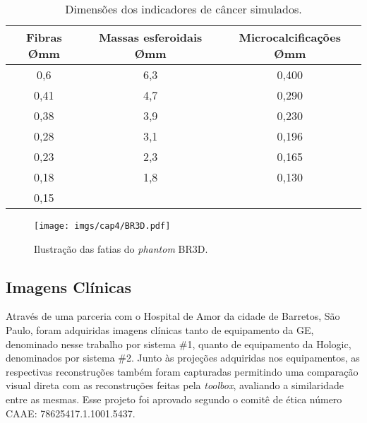  \begin{table}[H]
 	\centering
 	\caption{Dimensões dos indicadores de câncer simulados.}
 	\label{tab:tabCap4BR3D}
 	\begin{tabular}{c|c|c}
 		\textbf{Fibras {\O}mm}                                              & \textbf{Massas esferoidais {\O}mm} & \textbf{Microcalcificações {\O}mm} \\
 		[4pt]
 		\hline
 		\hline
 		\rule[0ex]{0pt}{1ex}
 		0,6 							 &             6,3             &            0,400            \\ \hline
 		\rule[0ex]{0pt}{1ex}
 		0,41                             &             4,7             &            0,290            \\ \hline
 		\rule[0ex]{0pt}{1ex}
 		0,38                             &             3,9             &            0,230            \\ \hline
 		\rule[0ex]{0pt}{1ex}
 		0,28                             &             3,1             &            0,196            \\ \hline
 		\rule[0ex]{0pt}{1ex}
 		0,23                             &             2,3             &            0,165            \\ \hline
 		\rule[0ex]{0pt}{1ex}
 		0,18                             &             1,8             &            0,130            \\ \hline
 		\rule[0ex]{0pt}{1ex}
 		0,15                             &                             &            	             \\ \hline
 	\end{tabular}
 	\vspace{2ex}
 \end{table}

\begin{figure}[H]
	\caption{Ilustração das fatias do \textit{phantom} BR3D.}
	\begin{center}
		\texttt{[image: imgs/cap4/BR3D.pdf]}
	\end{center}
	\label{fig:imgCap4BR3D}
\end{figure} 

\subsection{Imagens Clínicas}

Através de uma parceria com o Hospital de Amor da cidade de Barretos, São Paulo, foram adquiridas imagens clínicas tanto de equipamento da \acs{GE}, denominado nesse trabalho por sistema \#1, quanto de equipamento da Hologic, denominados por sistema \#2. Junto às projeções adquiridas nos equipamentos, as respectivas reconstruções também foram capturadas permitindo uma comparação visual direta com as reconstruções feitas pela \textit{toolbox}, avaliando a similaridade entre as mesmas. Esse projeto foi aprovado segundo o comitê de ética número CAAE: 78625417.1.1001.5437.

